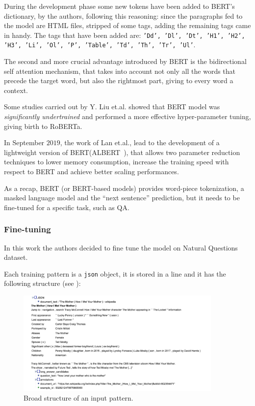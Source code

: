 \documentclass[10pt,hidelinks]{article}
\begin{document}
During the development phase some new tokens have been added to BERT's dictionary, by the authors, following this reasoning: since the paragraphs fed to the model are HTML files, stripped of some tags, adding the remaining tags came in handy. The tags that have been added are: \texttt{'Dd', 'Dl', 'Dt', 'H1', 'H2', 'H3', 'Li', 'Ol', 'P', 'Table', 'Td', 'Th', 'Tr', 'Ul'}.

The second and more crucial advantage introduced by BERT is the bidirectional self attention mechanism, that takes into account not only all the words that precede the target word, but also the rightmost part, giving to every word a context.

Some studies carried out by Y. Liu et.al. showed that BERT model was \emph{significantly undertrained}\cite{roberta} and performed a more effective hyper-parameter tuning, giving birth to RoBERTa.

In September $2019$, the work of Lan et.al., lead to the development of a lightweight version of BERT(ALBERT~\cite{albert}), that  allows two parameter reduction techniques to lower memory consumption, increase the training speed with respect to BERT and achieve better scaling performances.

As a recap, BERT (or BERT-based models) provides word-piece tokenization, a masked language model and  the ``next sentence'' prediction, but it needs to be fine-tuned for a specific task, such as QA.

\subsubsection{Fine-tuning}\label{subsubsec:finetuning}
In this work the authors decided to fine tune the model on Natural Questions dataset.

Each training pattern is a \texttt{json} object, it is stored in a line and it has the following structure (see ):

\begin{figure}[ht!]
	\centering
	\includegraphics[width=0.9\textwidth]{pics/json_cut.png}
	\caption{Broad structure of an input pattern.}\label{fig:json}
\end{figure}
\end{document}
